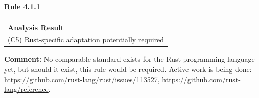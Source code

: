 \paragraph{Rule 4.1.1}
\begin{longtable}{p{13cm}}
\textbf{Analysis Result} \\
(C5) Rust-specific adaptation potentially required \\
\end{longtable}
\textbf{Comment:} No comparable standard exists for the Rust programming language yet, but should it exist, this rule would be required. Active work is being done: \url{https://github.com/rust-lang/rust/issues/113527}, \url{https://github.com/rust-lang/reference}. \\
